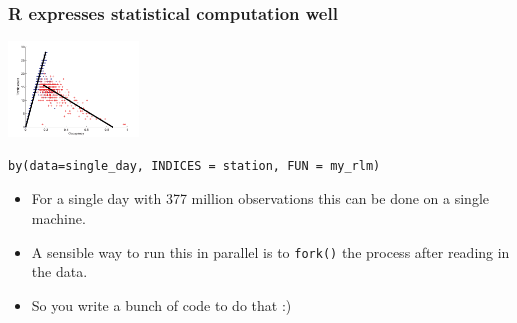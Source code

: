 \documentclass{beamer}
\begin{document}
\begin{frame}[fragile]

    \frametitle{R expresses statistical computation well}



\centerline{\includegraphics[height=1in]{fundamental_diagram.png}}

\begin{verbatim}
by(data=single_day, INDICES = station, FUN = my_rlm)
\end{verbatim}

    \begin{itemize}
        \item For a single day with 377 million observations this can be
            done on a single machine.
        \item A sensible way to run this in parallel is to \texttt{fork()}
            the process after reading in the data.
        \item So you write a bunch of code to do that :)
    \end{itemize}

\end{frame}
\end{document}

